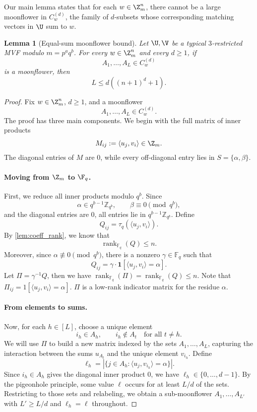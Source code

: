 \documentclass[11pt]{article}
\newtheorem{lemma}[maintheorem]{Lemma}
\theoremstyle{definition}
\begin{document}
Our main lemma states that for each $w \in \Z_m^n$, there cannot be a large moonflower in $C_w^{(d)}$, the family of $d$-subsets whose corresponding matching vectors in $\U$ sum to $w$.

\begin{lemma}[Equal-sum moonflower bound]\label{lem:equal-sum-moonflower}
Let $\U,\V$ be a typical $3$-restricted MVF modulo $m=p^aq^b$. For every $w\in\Z_m^n$ and every $d\ge 1$, if
\[
A_1,\ldots,A_L \in C_w^{(d)}
\]
is a moonflower, then
\[
L\le d\left((n+1)^d+1\right).
\]
\end{lemma}

\begin{proof}
Fix $w\in\Z_m^n$, $d\ge 1$, and a moonflower
\[
A_1,\ldots,A_L \in C_w^{(d)}.
\]
The proof has three main components. We begin with the full matrix of inner products
\[
M_{ij}:=\langle u_j,v_i\rangle\in\Z_m .
\]
The diagonal entries of $M$ are $0$, while every off-diagonal entry lies in
$S = \{\alpha,\beta\}$.

\paragraph{Moving from $\Z_m$ to $\F_q$.} First, we reduce all inner products modulo $q^b$. Since
\[
\alpha\in q^{b-1}\mathbb Z_{q^b},
\qquad
\beta\equiv 0\pmod {q^b},
\]
and the diagonal entries are $0$, all entries lie in $q^{b-1}\mathbb Z_{q^b}$. Define
\[
Q_{ij}
=
\tau_q(\langle u_j,v_i\rangle).
\]
By \cref{lem:coeff_rank}, we know that
\[
\operatorname{rank}_{\mathbb F_q}(Q)\le n.
\]
Moreover, since $\alpha \not\equiv 0\pmod{q^b}$, there is a nonzero $\gamma\in\mathbb F_q$ such that
\[
Q_{ij}
=
\gamma\cdot \mathbf 1[\langle u_j,v_i\rangle=\alpha].
\]
Let $\Pi = \gamma^{-1} Q$, then we have $\operatorname{rank}_{\mathbb F_q}(\Pi) = \operatorname{rank}_{\mathbb F_q}(Q) \le n$. Note that $\Pi_{ij} = 1[\langle u_j,v_i\rangle=\alpha].$ $\Pi$ is a low-rank indicator matrix for the residue $\alpha$. 

\paragraph{From elements to sums.} Now, for each $h\in[L]$, choose a unique element
\[
i_h\in A_h,
\qquad
i_h\notin A_t\quad\text{for all }t\ne h. 
\]
We will use
$\Pi$ to build a new matrix indexed by the sets $A_1,\ldots,A_L$, capturing the
interaction between the sums $u_{A_t}$ and the unique element $v_{i_h}$.
Define
\[
\ell_h
=
\left|\{j\in A_h:\langle u_j,v_{i_h}\rangle=\alpha\}\right|.
\]
Since $i_h\in A_h$ gives the diagonal inner product $0$, we have
$\ell_h\in\{0,\ldots,d-1\}$. By the pigeonhole principle, some value $\ell$ occurs for at least $L/d$ of the sets. Restricting to those sets and relabeling, we obtain a sub-moonflower $A_1,\ldots,A_{L'}$ with $L'\ge L/d$ and $\ell_h=\ell$ throughout.


\end{proof}
\end{document}
